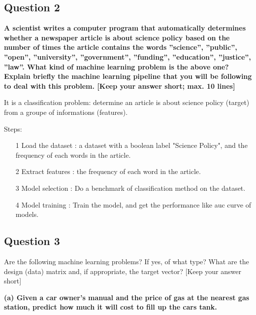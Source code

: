 \documentclass{article}
\begin{document}
\newpage
\subsection{Question 2}

{\bf A scientist writes a computer program that automatically determines whether a newspaper article is about science policy based on the number of times the article contains the words ”science”, ”public”, ”open”, ”university”, ”government”, ”funding”, ”education”, ”justice”, ”law”. What kind of machine learning problem is the above one? Explain briefly the machine learning pipeline that you will be following to deal with this problem. [Keep your answer short; max. 10 lines]}

\vspace{1em}


It is a classification problem: determine an article is about science policy (target) from a groupe of informations (features).

Steps:
\begin{itemize}
	\item[1] Load the dataset : a dataset with a boolean label "Science Policy", and the frequency of each words in the article. 
	
	\item[2] Extract features : the frequency of each word in the article.
	
	\item[3] Model selection : Do a benchmark of classification method on the dataset.
	
	\item[4] Model training : Train the model, and get the performance like auc curve of models.

\end{itemize}

\newpage
\subsection{Question 3}

Are the following machine learning problems? If yes, of what type? What are the design (data) matrix and, if appropriate, the target vector? [Keep your answer short]

\vspace{1em}

{\bf (a) Given a car owner’s manual and the price of gas at the nearest gas station, predict how much it will cost to fill up the cars tank.}\\
\end{document}
